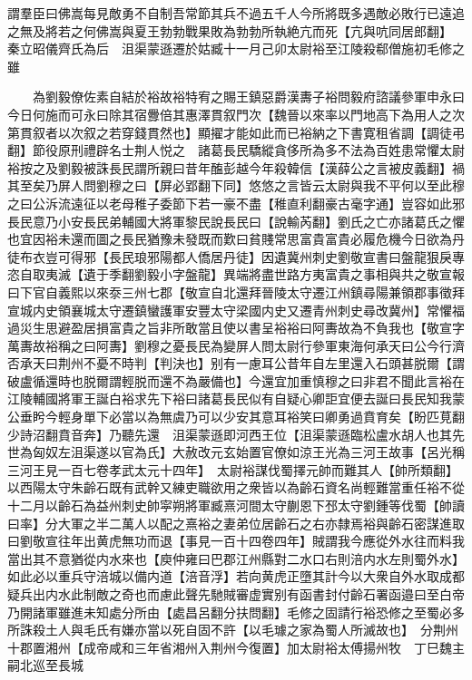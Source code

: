 謂羣臣曰佛嵩每見敵勇不自制吾常節其兵不過五千人今所將既多遇敵必敗行已遠追之無及將若之何佛嵩與夏王勃勃戰果敗為勃勃所執絶亢而死【亢與吭同居郎翻】　秦立昭儀齊氏為后　沮渠蒙遜遷於姑臧十一月己卯太尉裕至江陵殺郗僧施初毛修之雖

　　為劉毅僚佐素自結於裕故裕特宥之賜王鎮惡爵漢夀子裕問毅府諮議參軍申永曰今日何施而可永曰除其宿釁倍其惠澤貫叙門次【魏晉以來率以門地高下為用人之次第貫叙者以次叙之若穿錢貫然也】顯擢才能如此而已裕納之下書寛租省調【調徒弔翻】節役原刑禮辟名士荆人悦之　諸葛長民驕縱貪侈所為多不法為百姓患常懼太尉裕按之及劉毅被誅長民謂所親曰昔年醢彭越今年殺韓信【漢薛公之言被皮義翻】禍其至矣乃屏人問劉穆之曰【屏必郢翻下同】悠悠之言皆云太尉與我不平何以至此穆之曰公泝流遠征以老母稚子委節下若一豪不盡【稚直利翻豪古毫字通】豈容如此邪長民意乃小安長民弟輔國大將軍黎民說長民曰【說輸芮翻】劉氏之亡亦諸葛氏之懼也宜因裕未還而圖之長民猶豫未發既而歎曰貧賤常思富貴富貴必履危機今日欲為丹徒布衣豈可得邪【長民琅邪陽都人僑居丹徒】因遺冀州刺史劉敬宣書曰盤龍狠戾專恣自取夷滅【遺于季翻劉毅小字盤龍】異端將盡世路方夷富貴之事相與共之敬宣報曰下官自義熙以來沗三州七郡【敬宣自北還拜晉陵太守遷江州鎮尋陽兼領郡事徵拜宣城内史領襄城太守遷鎮蠻護軍安豐太守梁國内史又遷青州刺史尋改冀州】常懼福過災生思避盈居損富貴之旨非所敢當且使以書呈裕裕曰阿夀故為不負我也【敬宣字萬夀故裕稱之曰阿夀】劉穆之憂長民為變屏人問太尉行參軍東海何承天曰公今行濟否承天曰荆州不憂不時判【判決也】别有一慮耳公昔年自左里還入石頭甚脱爾【謂破盧循還時也脱爾謂輕脱而還不為嚴備也】今還宜加重慎穆之曰非君不聞此言裕在江陵輔國將軍王誕白裕求先下裕曰諸葛長民似有自疑心卿詎宜便去誕曰長民知我蒙公垂盻今輕身單下必當以為無虞乃可以少安其意耳裕笑曰卿勇過賁育矣【盼匹莧翻少詩沼翻賁音奔】乃聽先還　沮渠蒙遜即河西王位【沮渠蒙遜臨松盧水胡人也其先世為匈奴左沮渠遂以官為氏】大赦改元玄始置官僚如涼王光為三河王故事【呂光稱三河王見一百七卷孝武太元十四年】　太尉裕謀伐蜀擇元帥而難其人【帥所類翻】以西陽太守朱齡石既有武幹又練吏職欲用之衆皆以為齡石資名尚輕難當重任裕不從十二月以齡石為益州刺史帥寜朔將軍臧熹河間太守蒯恩下邳太守劉鍾等伐蜀【帥讀曰率】分大軍之半二萬人以配之熹裕之妻弟位居齡石之右亦隸焉裕與齡石密謀進取曰劉敬宣往年出黄虎無功而退【事見一百十四卷四年】賊謂我今應從外水往而料我當出其不意猶從内水來也【庾仲雍曰巴郡江州縣對二水口右則涪内水左則蜀外水】如此必以重兵守涪城以備内道【涪音浮】若向黄虎正墮其計今以大衆自外水取成都疑兵出内水此制敵之奇也而慮此聲先馳賊審虚實别有函書封付齡石署函邉曰至白帝乃開諸軍雖進未知處分所由【處昌呂翻分扶問翻】毛修之固請行裕恐修之至蜀必多所誅殺土人與毛氏有嫌亦當以死自固不許【以毛璩之家為蜀人所滅故也】　分荆州十郡置湘州【成帝咸和三年省湘州入荆州今復置】加太尉裕太傅揚州牧　丁巳魏主嗣北巡至長城

